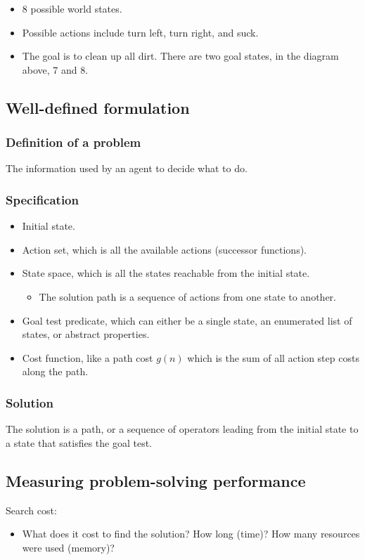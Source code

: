 \documentclass[11pt]{article}
\begin{document}
\begin{itemize}
\item 8 possible world states.
\item Possible actions include turn left, turn right, and suck.
\item The goal is to clean up all dirt. There are two goal states, in the diagram above, 7 and 8.
\end{itemize}

 \newpage
\subsection{Well-defined formulation}
\label{sec:org975048d}

\subsubsection{Definition of a problem}
\label{sec:org3097fbb}
The information used by an agent to decide what to do.
\subsubsection{Specification}
\label{sec:org960f58b}
\begin{itemize}
\item Initial state.
\item Action set, which is all the available actions (successor functions).
\item State space, which is all the states reachable from the initial state.
\begin{itemize}
\item The solution path is a sequence of actions from one state to another.
\end{itemize}
\item Goal test predicate, which can either be a single state, an enumerated list of states, or abstract properties.
\item Cost function, like a path cost \(g(n)\) which is the sum of all action step costs along the path.
\end{itemize}
\subsubsection{Solution}
\label{sec:org7328c7e}
The solution is a path, or a sequence of operators leading from the initial state to a state that satisfies the goal test.
\subsection{Measuring problem-solving performance}
\label{sec:org9b9d3d2}
Search cost:
\begin{itemize}
\item What does it cost to find the solution? How long (time)? How many resources were used (memory)?
\end{itemize}
\end{document}

